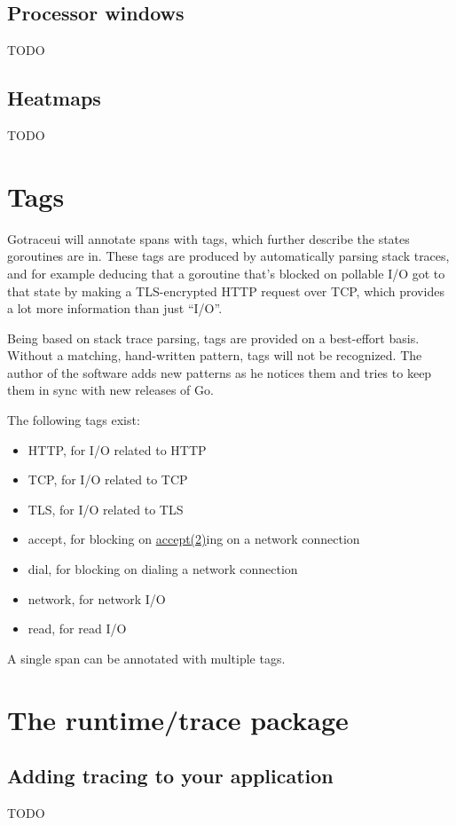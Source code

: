 \documentclass[10pt,letterpaper,oneside,openany,showtrims,draft]{memoir}
\newcommand{\code}[1]{{\ttfamily\mbox{#1}}}
\newcommand{\todo}[1]{{\color{red}#1}}
\begin{document}
\section{Processor windows}
\todo{TODO}
\section{Heatmaps}
\todo{TODO}




\chapter{Tags}
Gotraceui will annotate spans with tags, which further describe the states goroutines are in.
These tags are produced by automatically parsing stack traces,
and for example deducing that a goroutine that's blocked on pollable I/O got to that state by making a TLS-encrypted
HTTP request over TCP,
which provides a lot more information than just \enquote{I/O}.

Being based on stack trace parsing, tags are provided on a best-effort basis.
Without a matching, hand-written pattern, tags will not be recognized.
The author of the software adds new patterns as he notices them and tries to keep them in sync with new releases of Go.

The following tags exist:

\begin{itemize}
\item HTTP, for I/O related to HTTP
\item TCP, for I/O related to TCP
\item TLS, for I/O related to TLS
\item accept, for blocking on \href{https://man7.org/linux/man-pages/man2/accept.2.html}{accept(2)}ing on a network connection
\item dial, for blocking on dialing a network connection
\item network, for network I/O
\item read, for read I/O
\end{itemize}

A single span can be annotated with multiple tags.

\chapter{The \code{runtime/trace} package}
\section{Adding tracing to your application}
\todo{TODO}
\end{document}
